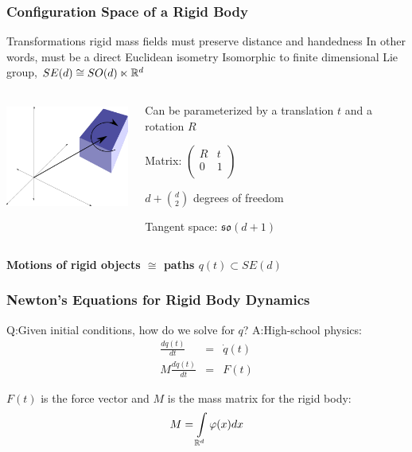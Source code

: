 \documentclass{beamer}
\begin{document}
\begin{frame}
\frametitle{Configuration Space of a Rigid Body}
Transformations rigid mass fields must preserve distance and handedness
\pause
\vskip5pt
In other words, must be a direct Euclidean isometry
\vskip5pt
Isomorphic to finite dimensional Lie group, $SE(d) \cong SO(d) \ltimes \mathbb{R}^d$
\vskip5pt
\pause
\begin{columns}
		\begin{center}
		\includegraphics[height=1.4in]{figures/rigidbody.png}
		\end{center}
		
		\begin{center}
		Can be parameterized by a translation $t$ and a rotation $R$
		
		\vskip15pt
		
		Matrix:
		$\left( \begin{array}{cc}
			R & t \\
			0 & 1 \\
		\end{array} \right)$
		
		\vskip15pt
		$d + {d \choose{2}}$ degrees of freedom
		
		\vskip15pt
		Tangent space: $\mathfrak{so}(d+1)$
		\end{center}
\end{columns}

\vskip10pt
\begin{center}
\bf{Motions of rigid objects $\cong$ paths $q(t) \subset SE(d)$}
\end{center}

\end{frame}

\begin{frame}
\frametitle{Newton's Equations for Rigid Body Dynamics}
Q:Given initial conditions, how do we solve for $q$?
\pause
\vskip5pt
A:High-school physics:
\begin{eqnarray*}
\frac{dq(t)}{dt} & = & \dot{q}(t) \\
M \frac{d\dot{q}(t)}{dt} & = & F(t)
\end{eqnarray*}
\vskip10pt

$F(t)$ is the force vector and $M$ is the mass matrix for the rigid body:
\[ M = \int \limits_{\mathbb{R}^d} \varphi(x) dx \]
\end{frame}
\end{document}
